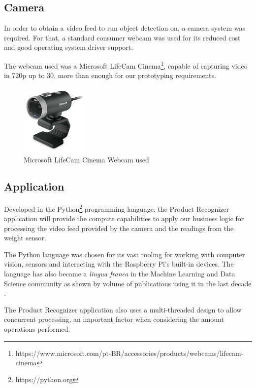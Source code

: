 \documentclass[openright]{normas-utf-tex} %
\begin{document}
\subsection{Camera}

In order to obtain a video feed to run object detection on, a camera system was
required. For that, a standard consumer webcam was used for its reduced cost
and good operating system driver support.

The webcam used was a Microsoft LifeCam
Cinema\footnote{https://www.microsoft.com/pt-BR/accessories/products/webcams/lifecam-cinema},
capable of capturing video in 720p up to 30, more
than enough for our prototyping requirements.

\begin{figure}[H]
	\centering
	\includegraphics[width=0.3\textwidth]{./images/webcam.jpg}
    \caption[Microsoft LifeCam Cinema Webcam used]{Microsoft LifeCam Cinema Webcam used}
\end{figure}

\subsection{Application}

Developed in the Python\footnote{https://python.org} programming language, the
Product Recognizer application will provide the compute capabilities to apply
our business logic for processing the video feed provided by the camera and the
readings from the weight sensor.

The Python language was chosen for its vast tooling for working with computer
vision, sensors and interacting with the Raspberry Pi's built-in devices. The
language has also became a \textit{lingua franca} in the Machine Learning and
Data Science community as shown by volume of publications using it in the last
decade \cite{Wes2017,Joel2019,Andreas2016}.

The Product Recognizer application also uses a multi-threaded design to allow
concurrent processing, an important factor when considering the amount
 operations performed.
\end{document}
